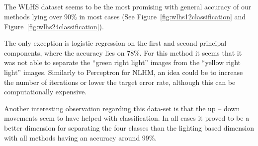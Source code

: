   \begin{minipage}{\linewidth}
  \centering
  \label{fig:wlhs12classification}
  \end{minipage}\\\\

  \begin{minipage}{\linewidth}
  \centering
  \label{fig:wlhs24classification}
  \end{minipage}\\\\

  The WLHS dataset seems to be the most promising with general accuracy of our methods lying over 90\% in most cases (See Figure~\ref{fig:wlhs12classification} and
  Figure~\ref{fig:wlhs24classification}).

  The only exception is logistic regression on the first and second principal components, where the accuracy lies on 78\%. For this method it seems
  that it was not able to separate the ``green right light'' images from the ``yellow right light'' images. Similarly to Perceptron for NLHM, an idea could
  be to increase the number of iterations or lower the target error rate, although this can be computationally expensive.

  Another interesting observation regarding this data-set is that the up -- down movements seem to have helped with classification. In all cases it proved
  to be a better dimension for separating the four classes than the lighting based dimension with all methods having an accuracy around 99\%.

